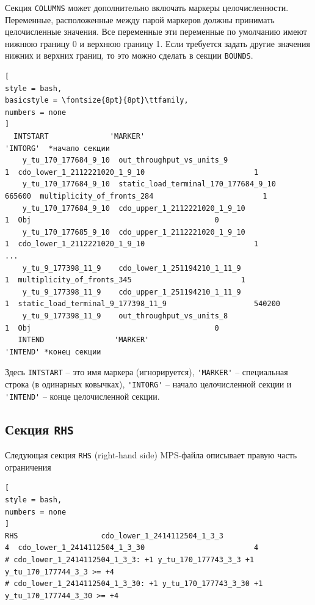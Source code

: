 \documentclass[%
	11pt,
	a4paper,
	utf8,
		]{article}
\begin{document}
Секция \verb|COLUMNS| может дополнительно включать маркеры целочисленности. Переменные, расположенные между парой маркеров должны принимать целочисленные значения. Все переменные эти переменные по умолчанию имеют нижнюю границу 0 и верхнюю границу 1. Если требуется задать другие значения нижних и верхних границ, то это можно сделать в секции \verb|BOUNDS|.
\begin{lstlisting}[
style = bash,
basicstyle = \fontsize{8pt}{8pt}\ttfamily,
numbers = none
]
  INTSTART              'MARKER'                                        'INTORG'  *начало секции
    y_tu_170_177684_9_10  out_throughput_vs_units_9                         1  cdo_lower_1_2112221020_1_9_10                         1
    y_tu_170_177684_9_10  static_load_terminal_170_177684_9_10                    665600  multiplicity_of_fronts_284                         1
    y_tu_170_177684_9_10  cdo_upper_1_2112221020_1_9_10                         1  Obj                                          0
    y_tu_170_177685_9_10  cdo_upper_1_2112221020_1_9_10                         1  cdo_lower_1_2112221020_1_9_10                         1
...
    y_tu_9_177398_11_9    cdo_lower_1_251194210_1_11_9                         1  multiplicity_of_fronts_345                         1
    y_tu_9_177398_11_9    cdo_upper_1_251194210_1_11_9                         1  static_load_terminal_9_177398_11_9                    540200
    y_tu_9_177398_11_9    out_throughput_vs_units_8                         1  Obj                                          0
   INTEND                'MARKER'                                        'INTEND' *конец секции
\end{lstlisting}

Здесь \verb|INTSTART| -- это имя маркера (игнорируется), \verb|'MARKER'| -- специальная строка (в одинарных ковычках), \verb|'INTORG'| -- начало целочисленной секции и \verb|'INTEND'| -- конце целочисленной секции.

\subsection{Секция \texttt{RHS}}

Следующая секция \verb|RHS| (right-hand side) MPS-файла описывает правую часть ограничения
\begin{lstlisting}[
style = bash,
numbers = none	
]
RHS                   cdo_lower_1_2414112504_1_3_3                         4  cdo_lower_1_2414112504_1_3_30                         4
# cdo_lower_1_2414112504_1_3_3: +1 y_tu_170_177743_3_3 +1 y_tu_170_177744_3_3 >= +4
# cdo_lower_1_2414112504_1_3_30: +1 y_tu_170_177743_3_30 +1 y_tu_170_177744_3_30 >= +4
\end{lstlisting}
\end{document}
